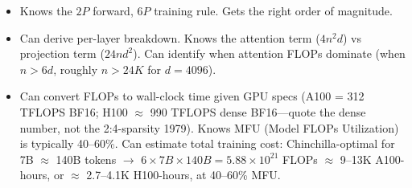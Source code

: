 \begin{interviewq}

\goodgreat
\begin{itemize}
    \item {} Knows the $2P$ forward, $6P$ training rule. Gets the right order of magnitude.
    \item {} Can derive per-layer breakdown. Knows the attention term ($4n^2d$) vs projection term ($24nd^2$). Can identify when attention FLOPs dominate (when $n > 6d$, roughly $n > 24K$ for $d=4096$).
    \item {} Can convert FLOPs to wall-clock time given GPU specs (A100 = 312 TFLOPS BF16; H100 $\approx$ 990 TFLOPS dense BF16---quote the dense number, not the 2:4-sparsity 1979). Knows MFU (Model FLOPs Utilization) is typically 40--60\%. Can estimate total training cost: Chinchilla-optimal for 7B $\approx$ 140B tokens $\rightarrow$ $6 \times 7B \times 140B = 5.88 \times 10^{21}$ FLOPs $\approx$ 9--13K A100-hours, or $\approx$ 2.7--4.1K H100-hours, at 40--60\% MFU.
\end{itemize}

\end{interviewq}

